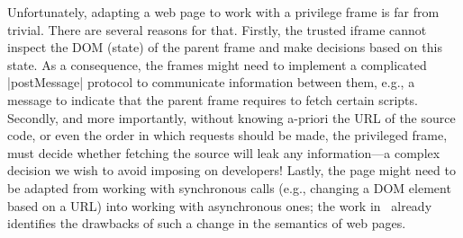 Unfortunately, adapting a web page to work with a privilege frame 
is far from trivial. There are several reasons for that. 
%
Firstly, the trusted iframe cannot inspect the DOM (state) of the parent frame
and make decisions based on this state. As a consequence, the frames might need to
implement a complicated \js|postMessage| protocol to communicate information
between them, e.g., a message to indicate that the parent frame requires to
fetch certain scripts. Secondly, and more importantly, without knowing a-priori
the URL of the source code, or even the order in which requests should be made,
the privileged frame, must decide whether fetching the source will leak any
information---a complex decision we wish to avoid imposing on developers!
Lastly, the page might need to be adapted from working with synchronous
calls (e.g., changing a DOM element based on a URL) into working with
asynchronous ones; the work in~\cite{Ingram:2012} already
identifies the drawbacks of such a change in the semantics of web pages.


%
%
%
%



